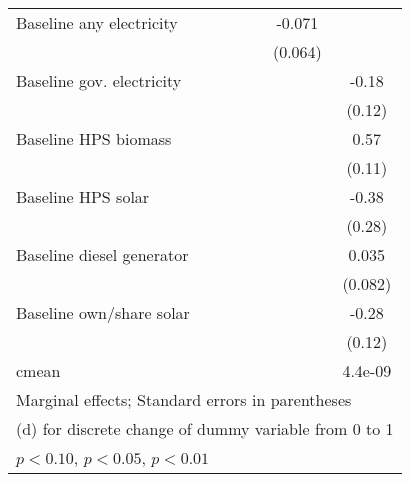 \begin{table}[htbp]
\begin{tabular*}{1\hsize}{@{\hskip\tabcolsep\extracolsep\fill}l*{5}{c}}
Baseline any electricity&                  &                  &                  &   -0.071         &                  \\
                &                  &                  &                  &  (0.064)         &                  \\
Baseline gov. electricity&                  &                  &                  &                  &    -0.18         \\
                &                  &                  &                  &                  &   (0.12)         \\
Baseline HPS biomass&                  &                  &                  &                  &     0.57\sym{***}\\
                &                  &                  &                  &                  &   (0.11)         \\
Baseline HPS solar&                  &                  &                  &                  &    -0.38         \\
                &                  &                  &                  &                  &   (0.28)         \\
Baseline diesel generator&                  &                  &                  &                  &    0.035         \\
                &                  &                  &                  &                  &  (0.082)         \\
Baseline own/share solar&                  &                  &                  &                  &    -0.28\sym{**} \\
                &                  &                  &                  &                  &   (0.12)         \\
\midrule
cmean           &                  &                  &                  &                  &  4.4e-09         \\
\bottomrule
\multicolumn{6}{l}{\footnotesize Marginal effects; Standard errors in parentheses}\\
\multicolumn{6}{l}{\footnotesize  (d) for discrete change of dummy variable from 0 to 1}\\
\multicolumn{6}{l}{\footnotesize \sym{*} \(p<0.10\), \sym{**} \(p<0.05\), \sym{***} \(p<0.01\)}\\
\end{tabular*}
\end{table}
